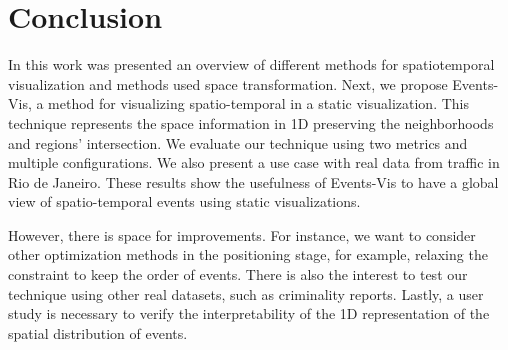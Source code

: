 \newpage 
\chapter{Conclusion}

In this work was presented an overview of different methods for spatiotemporal visualization and methods used space transformation.
%
Next, we propose Events-Vis, a method for visualizing spatio-temporal in a static visualization. 
%
This technique represents the space information in 1D preserving the neighborhoods and regions' intersection. 
%
We evaluate our technique using two metrics and multiple configurations. 
%
We also present a use case with real data from traffic in Rio de Janeiro. 
%
These results show the usefulness of Events-Vis to have a global view of spatio-temporal events using static visualizations. 


However, there is space for improvements. 
%
For instance, we want to consider other optimization methods in the positioning stage, for example, relaxing the constraint to keep the order of events.
%
There is also the interest to test our technique using other real datasets, such as criminality reports.
%
Lastly, a user study is necessary to verify the interpretability of the 1D representation of the spatial distribution of events.
